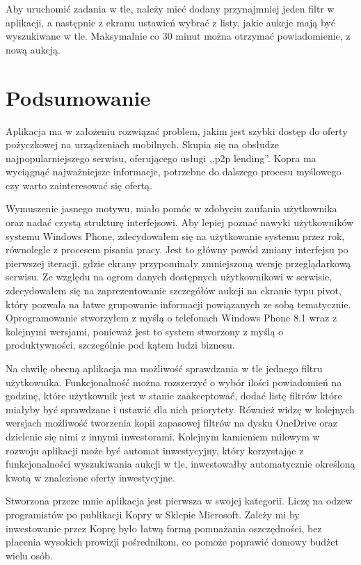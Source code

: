 \documentclass[a4paper,twoside,titlepage,openright]{book}
\begin{document}
Aby uruchomić zadania w tle, należy mieć dodany przynajmniej jeden filtr w aplikacji, a następnie z ekranu ustawień wybrać z listy, jakie aukcje mają być wyszukiwane w tle. Maksymalnie co 30 minut można otrzymać powiadomienie, z nową aukcją.
 
 

 
\chapter{Podsumowanie}
Aplikacja ma w założeniu rozwiązać problem, jakim jest szybki dostęp do oferty pożyczkowej na urządzeniach mobilnych. Skupia się na obsłudze najpopularniejszego serwisu, oferującego usługi ,,p2p lending''. Kopra ma wyciągnąć najważniejsze informacje, potrzebne do dalszego procesu myślowego czy warto zainteresować się ofertą. 

Wymuszenie jasnego motywu, miało pomóc w zdobyciu zaufania użytkownika oraz nadać czystą strukturę interfejsowi. Aby lepiej poznać nawyki użytkowników systemu Windows Phone, zdecydowałem się na użytkowanie systemu przez rok, równolegle z procesem pisania pracy. Jest to główny powód zmiany interfejsu po pierwszej iteracji, gdzie ekrany przypominały zmniejszoną wersję przeglądarkową serwisu. Ze względu na ogrom danych dostępnych użytkownikowi w serwisie, zdecydowałem się na zaprezentowanie szczegółów aukcji na ekranie typu pivot, który pozwala na łatwe grupowanie informacji powiązanych ze sobą tematycznie. 
Oprogramowanie stworzyłem z myślą o telefonach Windows Phone 8.1 wraz z kolejnymi wersjami, ponieważ jest to system stworzony z myślą o produktywności, szczególnie pod kątem ludzi biznesu. 

Na chwilę obecną aplikacja ma możliwość sprawdzania w tle jednego filtru użytkownika. Funkcjonalność można rozszerzyć o wybór ilości powiadomień na godzinę, które użytkownik jest w stanie zaakceptować, dodać listę filtrów które miałyby być sprawdzane i ustawić dla nich priorytety. Również widzę w kolejnych wersjach możliwość tworzenia kopii zapasowej filtrów na dysku OneDrive oraz dzielenie się nimi z innymi inwestorami. Kolejnym kamieniem milowym w rozwoju aplikacji może być automat inwestycyjny, który korzystając z funkcjonalności wyszukiwania aukcji w tle, inwestowałby automatycznie określoną kwotą w znalezione oferty inwestycyjne.

Stworzona przeze mnie aplikacja jest pierwsza w swojej kategorii. Liczę na odzew programistów po publikacji Kopry w Sklepie Microsoft. Zależy mi by inwestowanie przez Koprę było łatwą formą pomnażania oszczędności, bez płacenia wysokich prowizji pośrednikom, co pomoże poprawić domowy budżet wielu osób.
 
\end{document}
